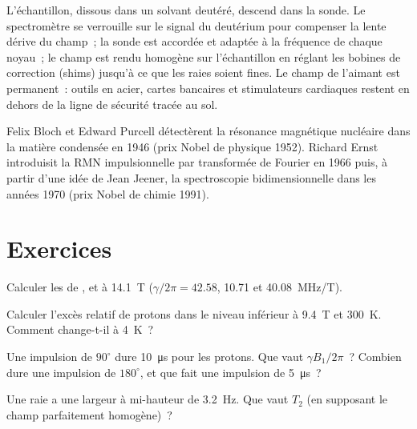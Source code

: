 \begin{inthelab}
L'échantillon, dissous dans un solvant deutéré, descend dans la sonde. Le
spectromètre se verrouille sur le signal du deutérium pour compenser la
lente dérive du champ~; la sonde est accordée et adaptée à la fréquence
de chaque noyau~; le champ est rendu homogène sur l'échantillon en
réglant les bobines de correction (shims) jusqu'à ce que les raies
soient fines. Le champ de l'aimant est permanent~: outils en acier,
cartes bancaires et stimulateurs cardiaques restent en dehors de la
ligne de sécurité tracée au sol.
\end{inthelab}

\begin{history}
Felix Bloch et Edward Purcell détectèrent la résonance magnétique
nucléaire dans la matière condensée en 1946 (prix Nobel de physique
1952). Richard Ernst introduisit la RMN impulsionnelle par transformée de
Fourier en 1966 puis, à partir d'une idée de Jean Jeener, la
spectroscopie bidimensionnelle dans les années 1970 (prix Nobel de
chimie 1991).
\end{history}

\section{Exercices}

\begin{exercise}[$\star$]\label{exo:b3:advanced-nmr:1}
Calculer les  de ,  et 
à \qty{14.1}{T}
($\gamma/2\pi = 42.58$, 10.71 et \qty{40.08}{MHz/T}).
\end{exercise}

\begin{exercise}[$\star$]\label{exo:b3:advanced-nmr:2}
Calculer l'excès relatif de protons dans le niveau inférieur à
\qty{9.4}{T} et
\qty{300}{K}. Comment change-t-il à \qty{4}{K}~?
\end{exercise}

\begin{exercise}[$\star$]\label{exo:b3:advanced-nmr:3}
Une impulsion de $90^\circ$ dure \qty{10}{\micro s} pour les protons.
Que vaut $\gamma B_1/2\pi$~? Combien dure une impulsion de
$180^\circ$, et que fait une impulsion de \qty{5}{\micro s}~?
\end{exercise}

\begin{exercise}[$\star$]\label{exo:b3:advanced-nmr:4}
Une raie a une largeur à mi-hauteur de \qty{3.2}{Hz}. Que vaut $T_2$ (en
supposant le champ parfaitement homogène)~?
\end{exercise}

